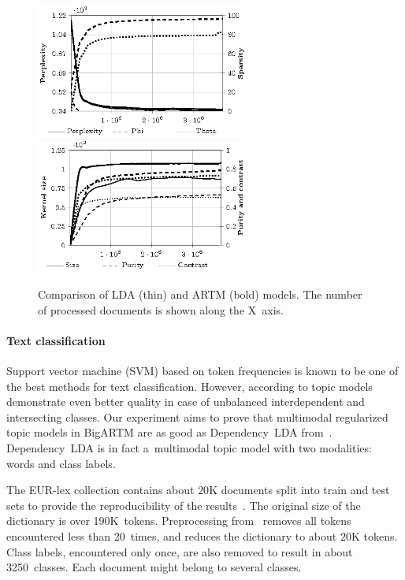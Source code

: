 \documentclass{acm_proc_article-sp}
\begin{document}
\begin{figure}[t]
    \centering
    \includegraphics[width=70mm]{plot_perplexity_sparsity.eps}\\
    \includegraphics[width=70mm]{plot_kernel.eps}
\caption{Comparison of LDA (thin) and ARTM (bold) models. The number of processed documents is shown along the X~axis.}
\label{fig:comparison_plot}
\end{figure}

\paragraph{Text classification}

Support vector machine (SVM) based on token frequencies is known to be one of the best methods for text classification.
However, according to \cite{rubin12statistical} topic models demonstrate even better quality in case of unbalanced interdependent and intersecting classes.
Our experiment aims to prove that multimodal regularized topic models in BigARTM are as good as Dependency~LDA from~\cite{rubin12statistical}.
Dependency~LDA is in fact a~multimodal topic model with two modalities: words and class labels.

The EUR-lex collection contains about $20$K documents
split into train and test sets to provide the reproducibility of the results~\cite{rubin12statistical}.
The original size of the dictionary is over 190K~tokens.
Preprocessing from~\cite{rubin12statistical} removes all tokens encountered less than 20~times,
and reduces the dictionary to about $20$K tokens.
Class labels, encountered only once, are also removed to result in about 3250~classes.
Each document might belong to several classes.
\end{document}
